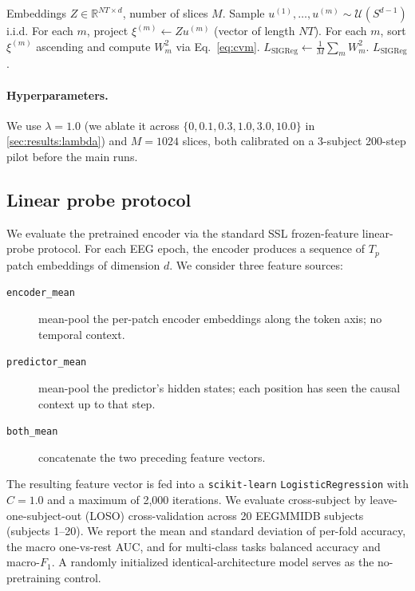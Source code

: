 \begin{algorithm}[t]
\caption{SIGReg loss with CvM univariate statistic.}
\label{alg:sigreg}
\begin{algorithmic}[1]
\REQUIRE Embeddings $Z \in \mathbb{R}^{NT \times d}$, number of slices $M$.
\STATE Sample $u^{(1)}, \dots, u^{(m)} \sim \mathcal{U}(S^{d-1})$ i.i.d.
\STATE For each $m$, project $\xi^{(m)} \gets Z u^{(m)}$ (vector of length $NT$).
\STATE For each $m$, sort $\xi^{(m)}$ ascending and compute $W^2_m$ via
       Eq.~\eqref{eq:cvm}.
\STATE $L_\text{SIGReg} \gets \tfrac{1}{M}\sum_m W^2_m$.
\RETURN $L_\text{SIGReg}$.
\end{algorithmic}
\end{algorithm}

\paragraph{Hyperparameters.}
We use $\lambda = 1.0$ (we ablate it across $\{0, 0.1, 0.3, 1.0, 3.0,
10.0\}$ in \cref{sec:results:lambda}) and $M = 1024$ slices, both calibrated
on a 3-subject 200-step pilot before the main runs.

\subsection{Linear probe protocol}
\label{sec:method:probe}

We evaluate the pretrained encoder via the standard SSL frozen-feature
linear-probe protocol. For each EEG epoch, the encoder produces a sequence
of $T_p$ patch embeddings of dimension $d$. We consider three feature
sources:
\begin{description}
  \item[\texttt{encoder\_mean}] mean-pool the per-patch encoder embeddings
    along the token axis; no temporal context.
  \item[\texttt{predictor\_mean}] mean-pool the predictor's hidden states;
    each position has seen the causal context up to that step.
  \item[\texttt{both\_mean}] concatenate the two preceding feature vectors.
\end{description}
The resulting feature vector is fed into a \texttt{scikit-learn}
\texttt{LogisticRegression} with $C{=}1.0$ and a maximum of 2{,}000
iterations. We evaluate cross-subject by leave-one-subject-out (LOSO)
cross-validation across 20 EEGMMIDB subjects (subjects 1--20). We report
the mean and standard deviation of per-fold accuracy, the macro one-vs-rest
AUC, and for multi-class tasks balanced accuracy and macro-$F_1$. A
randomly initialized identical-architecture model serves as the
no-pretraining control.


